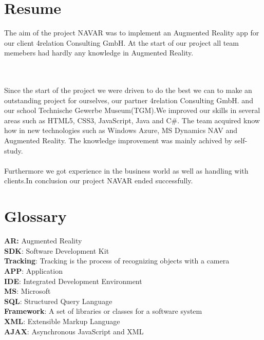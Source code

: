 \chapter{Resume}\label{chapter:Resume}
The aim of the project NAVAR was to implement an Augmented Reality app for our client 4relation Consulting GmbH. At the start of our project all team memebers had hardly any knowledge in Augmented Reality. 


\
\\\\
Since the start of the project we were driven to do the best we can to make an outstanding project for ourselves, our partner 4relation Consulting GmbH. and our school Technische Gewerbe Museum(TGM).We improved our skills in several areas such as HTML5, CSS3, JavaScript, Java and C\#. The team acquired know how in new technologies such as Windows Azure, MS Dynamics NAV and Augmented Reality. The knowledge improvement was mainly achived by self-study. 
\\
\\
 Furthermore we got experience in the business world as well as handling with clients.In conclusion our project NAVAR ended successfully. 
\clearpage

\chapter{Glossary}
\textbf{AR:} Augmented Reality
\\

\textbf{SDK}: Software Development Kit 
\\

\textbf{Tracking}: Tracking is the process of recognizing objects with a camera
\\

\textbf{APP}: Application 
\\

\textbf{IDE}: Integrated Development Environment 
\\

\textbf{MS}: Microsoft
\\

\textbf{SQL}: Structured Query Language
\\

\textbf{Framework}: A set of libraries or classes for a software system 
\\

\textbf{XML}: Extensible Markup Language
\\

\textbf{AJAX}:  Asynchronous JavaScript and XML
\\